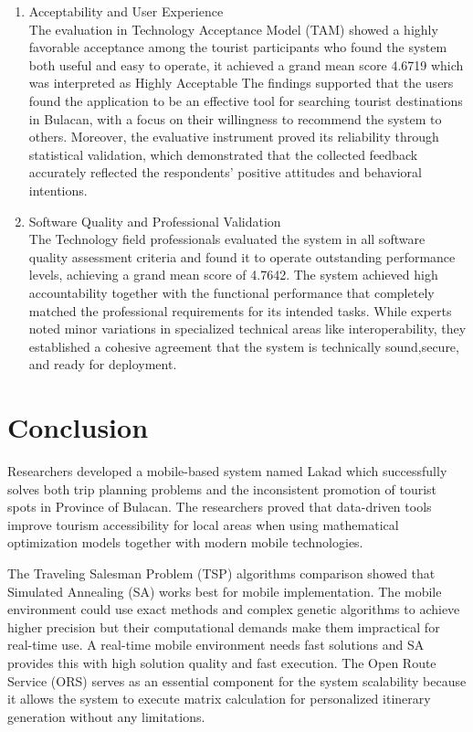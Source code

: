 \begin{enumerate}
	\item Acceptability and User Experience\\
	The evaluation in Technology Acceptance Model (TAM) showed a highly favorable acceptance among the tourist participants who found the system both useful and easy to operate, it achieved a grand mean score 4.6719 which was interpreted as Highly Acceptable The findings supported that the users found the application to be an effective tool for searching tourist destinations in Bulacan, with a focus on their willingness to recommend the system to others. Moreover, the evaluative instrument proved its reliability through statistical validation, which demonstrated that the collected feedback accurately reflected the respondents’ positive attitudes and behavioral intentions. 
	\item Software Quality and Professional Validation\\
		The Technology field professionals evaluated the system in all software quality assessment criteria and found it to operate outstanding performance levels, achieving a grand mean score of 4.7642. The system achieved high accountability together with the functional performance that completely matched the professional requirements for its intended tasks. While experts noted minor variations in specialized technical areas like interoperability, they established a cohesive  agreement that the system is technically sound,secure, and ready for deployment.

\end{enumerate}

\section{Conclusion}
Researchers developed a mobile-based system named Lakad which successfully solves both trip planning problems and the inconsistent promotion of tourist spots in Province of Bulacan. The researchers proved that data-driven tools improve tourism accessibility for local areas when using mathematical optimization models together with modern mobile technologies. 

The Traveling Salesman Problem (TSP) algorithms comparison showed that Simulated Annealing (SA) works best for mobile implementation. The mobile environment could use exact methods and complex genetic algorithms to achieve higher precision but their computational demands make them impractical for real-time use. A real-time mobile environment needs fast solutions and SA provides this with high solution quality and fast execution. The Open Route Service (ORS) serves as an essential component for the system scalability because it allows the system to execute matrix calculation for personalized itinerary generation without any limitations.

